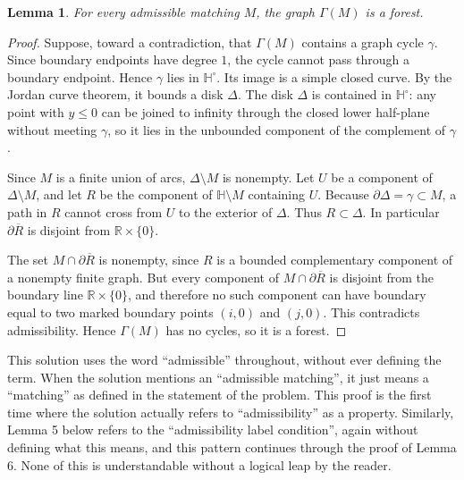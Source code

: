 \documentclass[12pt]{article}
\newcommand{\RR}{\mathbb{R}}
\newcommand{\HH}{\mathbb{H}}
\newcommand{\bd}{\partial}
\newtheorem{lemma}[theorem]{Lemma}
\theoremstyle{definition}
\newcommand{\review}[1]{\begin{reviewbox}#1\end{reviewbox}}
\begin{document}
\begin{lemma}\label{lem:forest}
For every admissible matching \(M\), the graph \(\Gamma(M)\) is a forest.
\end{lemma}

\begin{proof}
Suppose, toward a contradiction, that \(\Gamma(M)\) contains a graph cycle \(\gamma\).  Since boundary endpoints have degree \(1\), the cycle cannot pass through a boundary endpoint.  Hence \(\gamma\) lies in \(\HH^\circ\).  Its image is a simple closed curve.  By the Jordan curve theorem, it bounds a disk \(\Delta\).  The disk \(\Delta\) is contained in \(\HH^\circ\): any point with \(y\leq 0\) can be joined to infinity through the closed lower half-plane without meeting \(\gamma\), so it lies in the unbounded component of the complement of \(\gamma\).

Since \(M\) is a finite union of arcs, \(\Delta\setminus M\) is nonempty.  Let \(U\) be a component of \(\Delta\setminus M\), and let \(R\) be the component of \(\HH\setminus M\) containing \(U\).  Because \(\bd\Delta=\gamma\subset M\), a path in \(R\) cannot cross from \(U\) to the exterior of \(\Delta\).  Thus \(R\subset\Delta\).  In particular \(\bd\overline R\) is disjoint from \(\RR\times\{0\}\).

The set \(M\cap\bd\overline R\) is nonempty, since \(R\) is a bounded complementary component of a nonempty finite graph.  But every component of \(M\cap\bd\overline R\) is disjoint from the boundary line \(\RR\times\{0\}\), and therefore no such component can have boundary equal to two marked boundary points \((i,0)\) and \((j,0)\).  This contradicts admissibility.  Hence \(\Gamma(M)\) has no cycles, so it is a forest.
\end{proof}
\review{This solution uses the word ``admissible'' throughout, without ever defining the term. When the solution mentions an ``admissible matching'', it just means a ``matching'' as defined in the statement of the problem. This proof is the first time where the solution actually refers to ``admissibility'' as a property. Similarly, Lemma 5 below refers to the ``admissibility label condition'', again without defining what this means, and this pattern continues through the proof of Lemma 6. None of this is understandable without a logical leap by the reader.}
\end{document}
